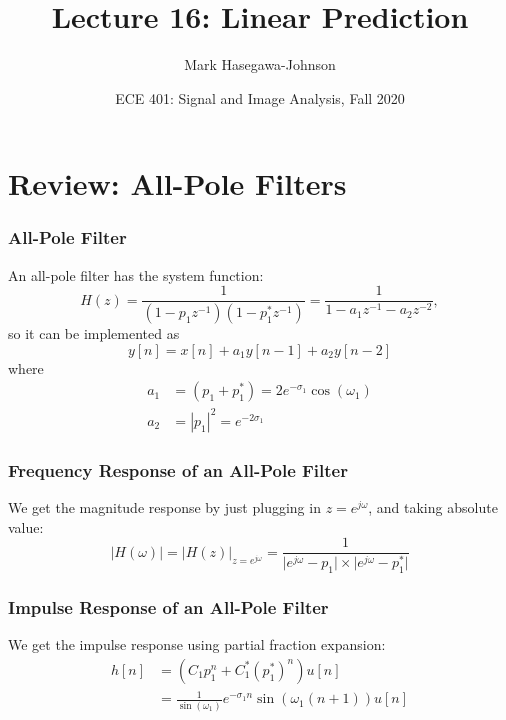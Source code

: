 \documentclass{beamer}
\title{Lecture 16: Linear Prediction}
\author{Mark Hasegawa-Johnson}
\date{ECE 401: Signal and Image Analysis, Fall 2020}
\begin{document}
\begin{frame}
  \maketitle
\end{frame}

\begin{frame}
  \tableofcontents
\end{frame}

\section[Review]{Review: All-Pole Filters}
\setcounter{subsection}{1}

\begin{frame}
  \frametitle{All-Pole Filter}

  An all-pole filter has the system function:
  \begin{displaymath}
  H(z) = \frac{1}{(1-p_1z^{-1})(1-p_1^*z^{-1})}= \frac{1}{1-a_1z^{-1}-a_2z^{-2}},
  \end{displaymath}
  so it can be implemented as
  \begin{displaymath}
    y[n] = x[n] + a_1y[n-1] + a_2y[n-2]
  \end{displaymath}
  where
  \begin{align*}
    a_1 &= (p_1+p_1^*) = 2e^{-\sigma_1}\cos(\omega_1)\\
    a_2 &= |p_1|^2 = e^{-2\sigma_1}
  \end{align*}
\end{frame}

\begin{frame}
  \frametitle{Frequency Response of an All-Pole Filter}

  We get the magnitude response by just plugging in $z=e^{j\omega}$,
  and taking absolute value:
  \begin{displaymath}
    |H(\omega)| = \lvert H(z)\rvert_{z=e^{j\omega}} = \frac{1}{\lvert e^{j\omega}-p_1\rvert\times\lvert e^{j\omega}-p_1^*\rvert}
  \end{displaymath}
  \centerline{}
\end{frame}

\begin{frame}
  \frametitle{Impulse Response of an All-Pole Filter}

  We get the impulse response using partial fraction expansion:
  \begin{align*}
    h[n] &= \left(C_1p_1^n + C_1^* (p_1^*)^n\right) u[n]\\
    &=\frac{1}{\sin(\omega_1)} e^{-\sigma_1n}\sin\left(\omega_1(n+1)\right)u[n]
  \end{align*}
  \centerline{}
\end{frame}
\end{document}

